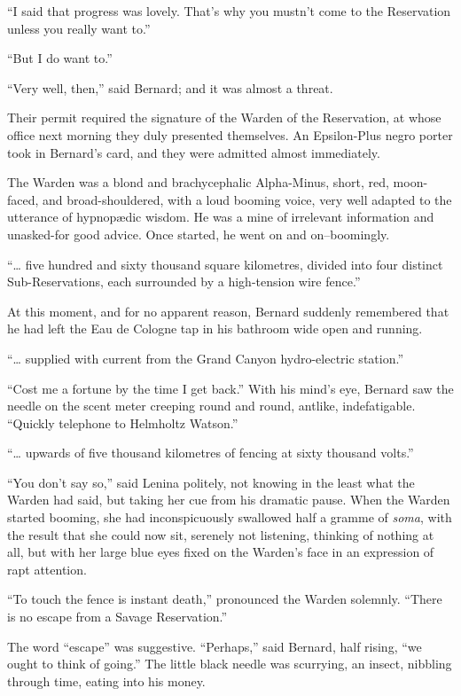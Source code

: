 \documentclass[12pt]{report}
\begin{document}
``I said that progress was lovely. That's why you mustn't come to the
Reservation unless you really want to.''

``But I do want to.''

``Very well, then,'' said Bernard; and it was almost a threat.

Their permit required the signature of the Warden of the Reservation, at
whose office next morning they duly presented themselves. An
Epsilon-Plus negro porter took in Bernard's card, and they were admitted
almost immediately.

The Warden was a blond and brachycephalic Alpha-Minus, short, red,
moon-faced, and broad-shouldered, with a loud booming voice, very well
adapted to the utterance of hypnopædic wisdom. He was a mine of
irrelevant information and unasked-for good advice. Once started, he
went on and on--boomingly.

``\ldots{} five hundred and sixty thousand square kilometres, divided
into four distinct Sub-Reservations, each surrounded by a high-tension
wire fence.''

At this moment, and for no apparent reason, Bernard suddenly remembered
that he had left the Eau de Cologne tap in his bathroom wide open and
running.

``\ldots{} supplied with current from the Grand Canyon hydro-electric
station.''

``Cost me a fortune by the time I get back.'' With his mind's eye,
Bernard saw the needle on the scent meter creeping round and round,
antlike, indefatigable. ``Quickly telephone to Helmholtz Watson.''

``\ldots{} upwards of five thousand kilometres of fencing at sixty
thousand volts.''

``You don't say so,'' said Lenina politely, not knowing in the least
what the Warden had said, but taking her cue from his dramatic pause.
When the Warden started booming, she had inconspicuously swallowed half
a gramme of \emph{soma}, with the result that she could now sit,
serenely not listening, thinking of nothing at all, but with her large
blue eyes fixed on the Warden's face in an expression of rapt attention.

``To touch the fence is instant death,'' pronounced the Warden solemnly.
``There is no escape from a Savage Reservation.''

The word ``escape'' was suggestive. ``Perhaps,'' said Bernard, half
rising, ``we ought to think of going.'' The little black needle was
scurrying, an insect, nibbling through time, eating into his money.
\end{document}
